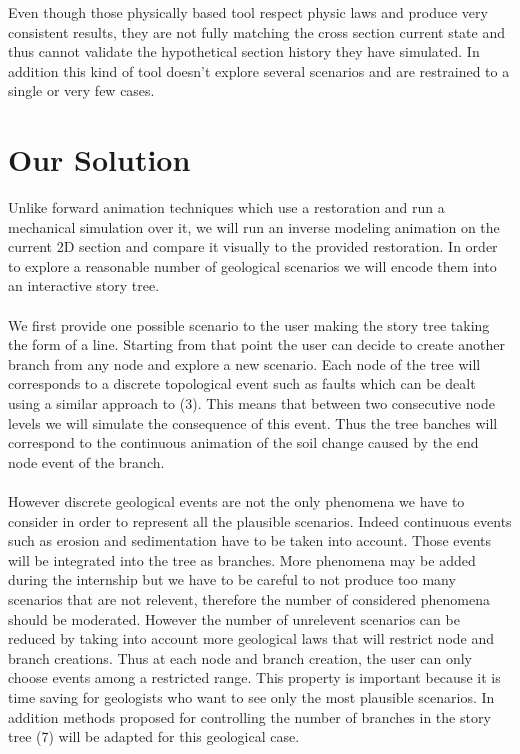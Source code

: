 \documentclass[12pt, a4paper]{memoir} %
\begin{document}
Even though those physically based tool respect physic laws and produce very consistent results, they are not fully matching the cross section current state and thus cannot validate the hypothetical section history they have simulated. In addition this kind of tool doesn't explore several scenarios and are restrained to a single or very few cases.
\section{Our Solution}

Unlike forward animation techniques which use a restoration and run a mechanical simulation over it, we will run an inverse modeling animation on the current 2D section and compare it visually to the provided restoration. In order to explore a reasonable number of geological scenarios we will encode them into an interactive story tree.\\\\

We first provide one possible scenario to the user making the story tree taking the form of a line. Starting from that point the user can decide to create another branch from any node and explore a new scenario. Each node of the tree will corresponds to a discrete topological event such as faults which can be dealt using a similar approach to (3). This means that between two consecutive node levels we will simulate the consequence of this event. Thus the tree banches will correspond to the continuous animation of the soil change caused by the end node event of the branch.\\\\

However discrete geological events are not the only phenomena we have to consider in order to represent all the plausible scenarios. Indeed continuous events such as erosion and sedimentation have to be taken into account. Those events will be integrated into the tree as branches.
More phenomena may be added during the internship but we have to be careful to not produce too many scenarios that are not relevent, therefore the number of considered phenomena should be moderated. However the number of unrelevent scenarios can be reduced by taking into account more geological laws that will restrict node and branch creations.
Thus at each node and branch creation, the user can only choose events among a restricted range. This property is important because it is time saving for geologists who want to see only the most plausible scenarios. In addition methods proposed for controlling the number of branches in the story tree (7) will be adapted for this geological case.\\\\
\end{document}
